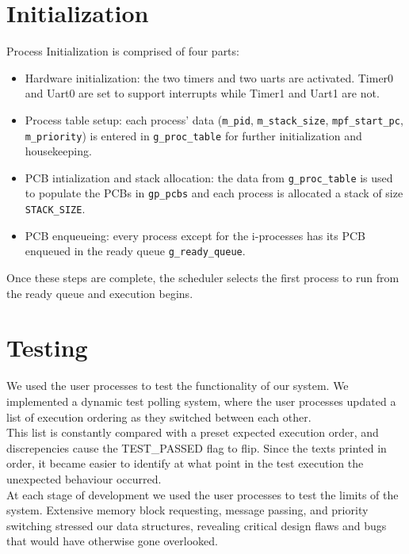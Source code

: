 \documentclass[12pt]{report}
\begin{document}
\section{Initialization}

Process Initialization is comprised of four parts:
\begin{itemize}
	\item Hardware initialization: the two timers and two uarts are activated. Timer0 and Uart0 are set to support interrupts while Timer1 and Uart1 are not.

	\item Process table setup: each process' data (\texttt{m_pid}, \texttt{m_stack_size},
		\texttt{mpf_start_pc}, \texttt{m_priority}) is entered in \texttt{g_proc_table}
		for further initialization and housekeeping.
	\item PCB intialization and stack allocation: the data from \texttt{g_proc_table}
		is used to populate the PCBs in \texttt{gp_pcbs} and each process is
		allocated a stack of size \texttt{STACK_SIZE}.
	\item PCB enqueueing: every process except for the i-processes has its PCB enqueued in the ready queue \texttt{g_ready_queue}.
\end{itemize}
Once these steps are complete, the scheduler selects the first process to run
from the ready queue and execution begins.\\


\section{Testing}

We used the user processes to test the functionality of our system. We implemented a dynamic test polling system, where the user processes updated a list of execution ordering as they switched between each other.\\

This list is constantly compared with a preset expected execution order, and discrepencies cause the TEST_PASSED flag to flip. Since the texts printed in order, it became easier to identify at what point in the test execution the unexpected behaviour occurred.\\

At each stage of development we used the user processes to test the limits of the system. Extensive memory block requesting, message passing, and priority switching stressed our data structures, revealing critical design flaws and bugs that would have otherwise gone overlooked. \\
\end{document}
